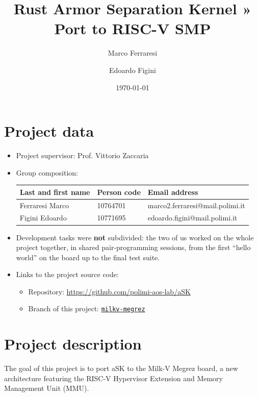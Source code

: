 \documentclass[10pt,a4]{article}
\author{Marco Ferraresi \and Edoardo Figini}
\date{\today}
\title{Rust Armor Separation Kernel » Port to RISC-V SMP}
\begin{document}
\maketitle
\tableofcontents

\section{Project data}

\begin{itemize}
\item
  Project supervisor: Prof. Vittorio Zaccaria

\item
Group composition:
\begin{center}
\begin{tabular}{lll}
Last and first name & Person code & Email address\\
\hline
  Ferraresi Marco & 10764701 & marco2.ferraresi@mail.polimi.it \\
  Figini Edoardo & 10771695 & edoardo.figini@mail.polimi.it \\
\end{tabular}
\end{center}

\item
Development tasks were \textbf{not} subdivided: the two of us worked on the
whole project together, in shared pair-programming sessions, from the first
``hello world'' on the board up to the final test suite. 

\item Links to the project source code:

\begin{itemize}
\item Repository: \href{https://github.com/polimi-aos-lab/aSK/tree/milkv-megrez}
{https://github.com/polimi-aos-lab/aSK}
\item Branch of this project: \href{https://github.com/polimi-aos-lab/aSK/tree/milkv-megrez}
{\texttt{milkv-megrez}}
\end{itemize}

\end{itemize}


\section{Project description}

The goal of this project is to port aSK to the Milk-V Megrez board, a new architecture 
featuring the RISC-V Hypervisor Extension and Memory Management Unit (MMU).
\end{document}
